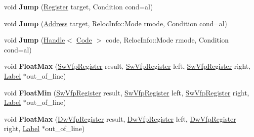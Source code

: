 \begin{DoxyCompactItemize}
\mbox{\label{classv8_1_1internal_1_1TurboAssembler_a00b649e07417eefbf242c5583f9bb1d2}} 
void {\bfseries Jump} (\mbox{\hyperlink{classv8_1_1internal_1_1Register}{Register}} target, Condition cond=al)
\item 
\mbox{\label{classv8_1_1internal_1_1TurboAssembler_a70d82703c3ebf605197b18749ac052ba}} 
void {\bfseries Jump} (\mbox{\hyperlink{classuintptr__t}{Address}} target, Reloc\+Info\+::\+Mode rmode, Condition cond=al)
\item 
\mbox{\label{classv8_1_1internal_1_1TurboAssembler_a51d9089ea6fb8d14ac1281bd3063b9c1}} 
void {\bfseries Jump} (\mbox{\hyperlink{classv8_1_1internal_1_1Handle}{Handle}}$<$ \mbox{\hyperlink{classv8_1_1internal_1_1Code}{Code}} $>$ code, Reloc\+Info\+::\+Mode rmode, Condition cond=al)
\item 
\mbox{\label{classv8_1_1internal_1_1TurboAssembler_a0c1bd45963c2269eaa6b03bba8b8f01d}} 
void {\bfseries Float\+Max} (\mbox{\hyperlink{classv8_1_1internal_1_1SwVfpRegister}{Sw\+Vfp\+Register}} result, \mbox{\hyperlink{classv8_1_1internal_1_1SwVfpRegister}{Sw\+Vfp\+Register}} left, \mbox{\hyperlink{classv8_1_1internal_1_1SwVfpRegister}{Sw\+Vfp\+Register}} right, \mbox{\hyperlink{classv8_1_1internal_1_1Label}{Label}} $\ast$out\+\_\+of\+\_\+line)
\item 
\mbox{\label{classv8_1_1internal_1_1TurboAssembler_a0e74891d49b2a4456b887522c168059f}} 
void {\bfseries Float\+Min} (\mbox{\hyperlink{classv8_1_1internal_1_1SwVfpRegister}{Sw\+Vfp\+Register}} result, \mbox{\hyperlink{classv8_1_1internal_1_1SwVfpRegister}{Sw\+Vfp\+Register}} left, \mbox{\hyperlink{classv8_1_1internal_1_1SwVfpRegister}{Sw\+Vfp\+Register}} right, \mbox{\hyperlink{classv8_1_1internal_1_1Label}{Label}} $\ast$out\+\_\+of\+\_\+line)
\item 
\mbox{\label{classv8_1_1internal_1_1TurboAssembler_a27f962b9285c9a9a5c1f3026c1d2d71a}} 
void {\bfseries Float\+Max} (\mbox{\hyperlink{classv8_1_1internal_1_1DwVfpRegister}{Dw\+Vfp\+Register}} result, \mbox{\hyperlink{classv8_1_1internal_1_1DwVfpRegister}{Dw\+Vfp\+Register}} left, \mbox{\hyperlink{classv8_1_1internal_1_1DwVfpRegister}{Dw\+Vfp\+Register}} right, \mbox{\hyperlink{classv8_1_1internal_1_1Label}{Label}} $\ast$out\+\_\+of\+\_\+line)

\end{DoxyCompactItemize}
